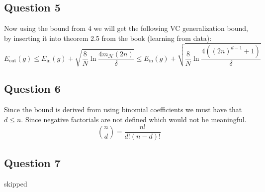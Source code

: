 \subsection{Question 5}
Now using the bound from 4 we will get the following VC generalization bound, by inserting it into theorem 2.5 from the book (learning from data):
\[E_{\text{out}}(g) \leq E_{\text{in}}(g) + \sqrt{ \frac{8}{N} \ln \frac{4m_{\mathcal{H}}(2n)}{\delta}} \leq E_{\text{in}}(g) + \sqrt{ \frac{8}{N} \ln \frac{4 \left((2n)^{d-1}+1 \right)}{\delta}} \] 

\subsection{Question 6}
Since the bound is derived from using binomial coefficients we must have that $d \leq n$. Since negative factorials are not defined which would not be meaningful. 
\[ \binom{n}{d}=\frac{n!}{d!(n-d)!}\] 

\subsection{Question 7}
skipped
